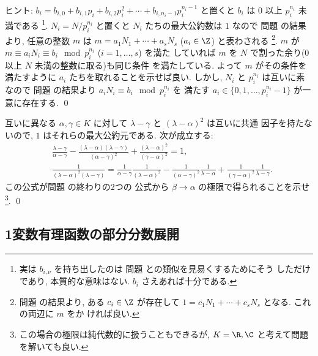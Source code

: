 \documentclass[12pt,twoside]{jarticle}
\begin{document}
\noindent
ヒント: $b_i=b_{i,0} + b_{i,1} p_i + b_{i,2} p_i^2 + \cdots + b_{i,n_i-1}
p_i^{n_i-1}$ と置くと $b_i$ は $0$ 以上 $p_i^{n_i}$ 未満である%
\footnote{実は $b_{i,\nu}$ を持ち出したのは
  問題  との類似を見易くするためにそう
  しただけであり, 本質的な意味はない. $b_i$ さえあれば十分である.}.  %
$N_i=N/p_i^{n_i}$ と置くと $N_i$ たちの最大公約数は $1$ なので
問題  の結果より, 
任意の整数 $m$ は $m = a_1 N_1 + \cdots + a_s N_s$ ($a_i \in \Z$) 
と表わされる%
\footnote{問題  の結果より, ある $c_i\in\Z$ 
  が存在して $1 = c_1 N_1 + \cdots + c_s N_s$ となる. これの両辺に $m$ をか
  ければ良い.}.
$m$ が $m \equiv a_i N_i \equiv b_i \mod{p_i^{n_i}}$ ($i=1,\dots,s$) を満た
していれば $m$ を $N$ で割った余り($0$ 以上 $N$ 未満の整数に取る)も同じ条件
を満たしている.   
よって $m$ がその条件を満たすように $a_i$ たちを取れることを示せば良い.
しかし, $N_i$ と $p_i^{n_i}$ は互いに素なので
問題  の結果より $a_iN_i\equiv b_i \mod{p_i^{n_i}}$ を
満たす $a_i\in\{0,1,\dots,p_i^{n_i}-1\}$ が一意に存在する.
\qed


\begin{question}
\label{q:Lagrange-interpolation-5}
  互いに異なる $\alpha,\gamma\in K$ に対して
  $\lambda-\gamma$ と $(\lambda-\alpha)^2$ は互いに共通
  因子を持たないので, $1$ はそれらの最大公約元である. 
  次が成立する:
  \begin{align*}
    &
     \frac{\lambda-\gamma}{\alpha-\gamma}
    -\frac{(\lambda-\alpha)(\lambda-\gamma)}{(\alpha-\gamma)^2}
    +\frac{(\lambda-\alpha)^2}{(\gamma-\alpha)^2}
    = 1,
    \\ &
    \frac{1}{(\lambda-\alpha)^2(\lambda-\gamma)}
    =
     \frac{1}{\alpha-\gamma}
     \frac{1}{(\lambda-\alpha)^2}
    -\frac{1}{(\alpha-\gamma)^2}
     \frac{1}{\lambda-\alpha}
    +\frac{1}{(\gamma-\alpha)^2}
     \frac{1}{\lambda-\gamma}.
  \end{align*}
  この公式が問題  の終わりの2つの
  公式から $\beta\to\alpha$ の極限で得られることを示せ%
  \footnote{この場合の極限は純代数的に扱うこともできるが,
    $K=\R,\C$ と考えて問題を解いても良い.}.
  \qed
\end{question}


\subsection{1変数有理函数の部分分数展開}
\label{sec:partial-fraction}
\end{document}
